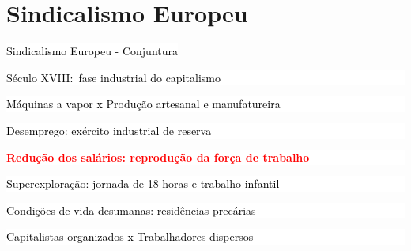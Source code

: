 \section{Sindicalismo Europeu}

{
\begin{frame}{\colorbox{white}{\textcolor{black}{Sindicalismo Europeu - Conjuntura}}}
    \begin{itemize}
        \colorbox{white}{\textcolor{black}{
        \item Século XVIII:\ fase industrial do capitalismo
        }}
        \colorbox{white}{\textcolor{black}{
        \item Máquinas a vapor x Produção artesanal e manufatureira
        }}
        \colorbox{white}{\textcolor{black}{
        \item Desemprego: exército industrial de reserva
        }}
        \colorbox{white}{\textcolor{black}{
        \item \textbf{\textcolor{red}{Redução dos salários: reprodução da força de trabalho}}
        }}
        \colorbox{white}{\textcolor{black}{
        \item Superexploração: jornada de 18 horas e trabalho infantil
        }}
        \colorbox{white}{\textcolor{black}{
        \item Condições de vida desumanas: residências precárias
        }}
        \colorbox{white}{\textcolor{black}{
        \item Capitalistas organizados x Trabalhadores dispersos
        }}
    \end{itemize}
\end{frame}
}

